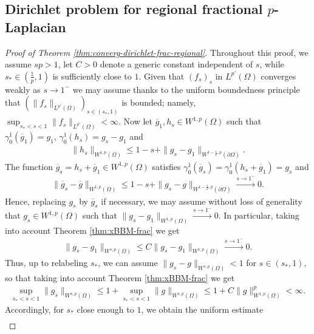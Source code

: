 \documentclass[12pt, reqno]{amsart}%
\theoremstyle{plain}  %
\theoremstyle{definition}  %
\theoremstyle{remark}
\numberwithin{equation}{section}
\begin{document}
\subsection{Dirichlet  problem for regional fractional $p$-Laplacian}\label{sec:regional-frac-plaplace}
\begin{proof}[Proof of Theorem \ref{thm:converg-dirichlet-frac-regional}]
Throughout this proof, we assume $sp>1$, let $C>0$ denote a generic constant independent of $s$, while $s_* \in (\tfrac{1}{p}, 1)$ is sufficiently close to $1$.
Given that  $(f_s)_s$ in $L^{p'}(\Omega)$  converges  weakly as $s\to 1^-$ we may assume thanks to the uniform boundedness principle that $(\|f_s\|_{L^{p'}(\Omega)})_{s\in (s_*,1)}$ is bounded; namely, $\sup_{s_*<s<1} \| f_s\|_{L^{p'}(\Omega)} < \infty.$ Now let $\overline{g}_1, h_s \in W^{1,p}(\Omega)$ such that
$\gamma^1_0(\overline{g}_1)= g_1$, $\gamma^1_0 (h_s)= g_s-g_1$ and
\begin{align*}
\|h_s\|_{W^{1,p}(\Omega)}\leq 1-s+ \|g_s-g_1\|_{W^{1-\frac{1}{p},p}(\partial \Omega)}.
\end{align*}
The function $ \overline{g}_s= h_s +\overline{g}_1\in W^{1,p}(\Omega)$ satisfies  $\gamma^1_0(\overline{g}_s) = \gamma^1_0(h_s+\overline{g}_1) = g_s$  and
\begin{align}\label{eq:gs-frac-extens}
\|\overline{g}_s-\overline{g}\|_{W^{1,p}(\Omega)}\leq 1-s+ \|g_s-g\|_{W^{1-\frac{1}{p},p}(\partial \Omega)}\xrightarrow{s\to1^-}0.
\end{align}
Hence, replacing $g_s$ by $\overline{g}_s$ if necessary, we may assume without loss of generality that $g_s\in W^{1,p}(\Omega)$ such that $\|g_s-g_1 \|_{W^{1,p}(\Omega)}\xrightarrow{s\to1^-}0.$ In particular, taking into account Theorem \ref{thm:xBBM-frac}  we get
\begin{align}\label{eq:xgs-conv-uni}
 \|g_s-g_1 \|_{W^{s,p}(\Omega)}\leq C\|g_s-g_1 \|_{W^{1,p}(\Omega)}\xrightarrow{s\to1^-}0.
\end{align}
Thus, up to relabeling $s_*$, we can assume $\|g_s-g \|_{W^{s,p}(\Omega)}<1$ for $s\in (s_*, 1)$, so that taking into account Theorem \ref{thm:xBBM-frac}  we get
\begin{align*}
\sup_{s_*<s<1}\|g_s \|_{W^{s,p}(\Omega)}\leq 1+ \sup_{s_*<s<1}
\|g \|_{W^{s,p}(\Omega)}\leq 1+  C \|g\|^p_{W^{1,p}(\Omega)}<\infty.
\end{align*}
Accordingly, for $s_*$ close enough to $1$,  we obtain the uniform estimate
\begin{align}\label{eq:uniform-bdd-f-g-D-regio}

\end{align}
\end{proof}
\end{document}
